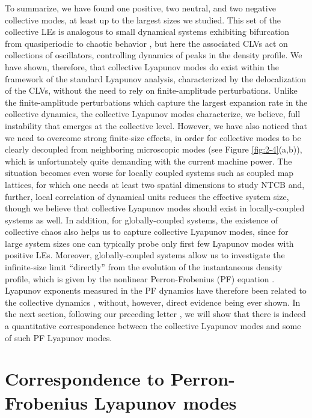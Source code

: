 \documentclass[12pt]{iopart}
\begin{document}
To summarize, we have found
 one positive, two neutral, and two negative collective modes,
 at least up to the largest sizes we studied.
This set of the collective LEs is analogous to small dynamical systems
 exhibiting bifurcation from quasiperiodic to chaotic behavior
 \cite{Sano.Sawada-PLA1983}, but here
 the associated CLVs act on collections of oscillators,
 controlling dynamics of peaks in the density profile.
We have shown, therefore, that collective Lyapunov modes do exist
 within the framework of the standard Lyapunov analysis,
 characterized by the delocalization of the CLVs,
 without the need to rely on finite-amplitude perturbations.
Unlike the finite-amplitude perturbations
 which capture the largest expansion rate in the collective dynamics,
 the collective Lyapunov modes characterize, we believe,
 full instability that emerges at the collective level.
However, we have also noticed that we need to overcome
 strong finite-size effects, in order for collective modes
 to be clearly decoupled from neighboring microscopic modes
 (see Figure \ref{fig:2-4}(a,b)),
 which is unfortunately quite demanding with the current machine power.
The situation becomes even worse for locally coupled systems
 such as coupled map lattices,
 for which one needs at least two spatial dimensions to study NTCB
 \cite{Chate.Manneville-PTP1992}
 and, further, local correlation of dynamical units
 reduces the effective system size,
 though we believe that collective Lyapunov modes
 should exist in locally-coupled systems as well.
In addition, for globally-coupled systems,
 the existence of collective chaos also helps us to capture
 collective Lyapunov modes,
 since for large system sizes
 one can typically probe only first few Lyapunov modes
 with positive LEs.
Moreover, globally-coupled systems allow us to investigate
 the infinite-size limit ``directly'' from the evolution
 of the instantaneous density profile,
 which is given by the nonlinear Perron-Frobenius (PF) equation
 \cite{Pikovsky.Kurths-PRL1994,Shibata.etal-PRL1999,Kaneko-PD1995}.
Lyapunov exponents measured in the PF dynamics
 have therefore been related to the collective dynamics \cite{Kaneko-PD1995},
 without, however, direct evidence being ever shown.
In the next section,
 following our preceding letter \cite{Takeuchi.etal-PRL2009},
 we will show that there is indeed a quantitative correspondence
 between the collective Lyapunov modes and some of such PF Lyapunov modes.


\section{Correspondence to Perron-Frobenius Lyapunov modes}  \label{sec:ColPF}
\end{document}
